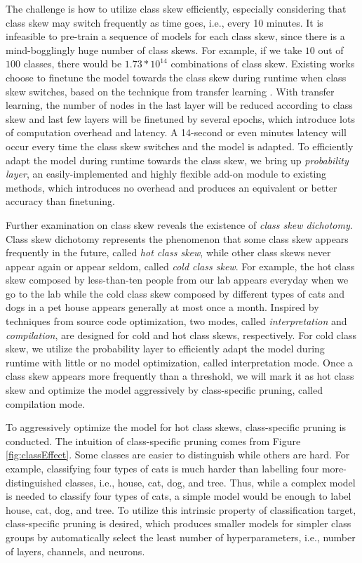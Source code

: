 \documentclass[pageno]{jpaper}
\begin{document}
The challenge is how to utilize class skew efficiently, especially considering that class skew may switch frequently as time goes, i.e., every 10 minutes. It is infeasible to pre-train a sequence of models for each class skew, since there is a mind-bogglingly huge number of class skews. For example, if we take $10$ out of $100$ classes, there would be $1.73 \ast 10^{14}$ combinations of class skew. Existing works \cite{han2016mcdnn, shen2016fast} choose to finetune the model towards the class skew during runtime when class skew switches, based on the technique from transfer learning  \cite{doersch2015unsupervised, noroozi2016unsupervised, oquab2014learning, yosinski2014transferable}. With transfer learning, the number of nodes in the last layer will be reduced according to class skew and last few layers will be finetuned by several epochs, which introduce lots of computation overhead and latency. A 14-second or even minutes latency \cite{shen2016fast} will occur every time the class skew switches and the model is adapted. To efficiently adapt the model during runtime towards the class skew, we bring up \textit{probability layer}, an easily-implemented and highly flexible add-on module to existing methods, which introduces no overhead and produces an equivalent or better accuracy than finetuning.

Further examination on class skew reveals the existence of \textit{class skew dichotomy}. Class skew dichotomy represents the phenomenon that some class skew appears frequently in the future, called \textit{hot class skew}, while other class skews never appear again or appear seldom, called \textit{cold class skew}. For example, the hot class skew composed by less-than-ten people from our lab appears everyday when we go to the lab while the cold class skew composed by different types of cats and dogs in a pet house appears generally at most once a month. Inspired by techniques from source code optimization, two modes, called \textit{interpretation} and \textit{compilation}, are designed for cold and hot class skews, respectively. For cold class skew, we utilize the probability layer to efficiently adapt the model during runtime with little or no model optimization, called interpretation mode. Once a class skew appears more frequently than a threshold, we will mark it as hot class skew and optimize the model aggressively by class-specific pruning, called compilation mode. 


To aggressively optimize the model for hot class skews, class-specific pruning is conducted. The intuition of class-specific pruning comes from Figure \ref{fig:classEffect}. Some classes are easier to distinguish while others are hard. For example, classifying four types of cats is much harder than labelling four more-distinguished classes, i.e., house, cat, dog, and tree. Thus, while a complex model is needed to classify four types of cats, a simple model would be enough to label house, cat, dog, and tree. To utilize this intrinsic property of classification target, class-specific pruning is desired, which produces smaller models for simpler class groups by automatically select the least number of hyperparameters, i.e., number of layers, channels, and neurons. 
\end{document}
